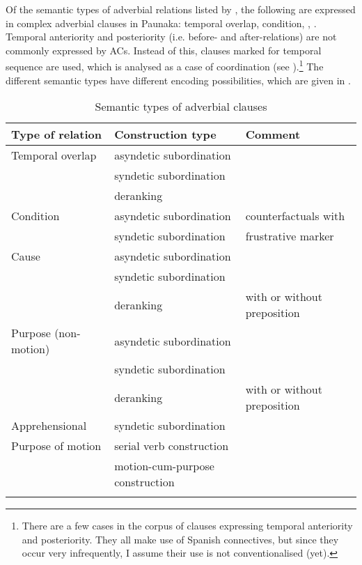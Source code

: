 Of the semantic types of adverbial relations listed by \citet[156]{Cristofaro2003}, the following are expressed in complex adverbial clauses in Paunaka: temporal overlap, condition, , . Temporal anteriority and posteriority (i.e. before- and after-relations) are not commonly expressed by ACs. Instead of this, clauses marked for temporal sequence are used, which is analysed as a case of coordination (see ).\footnote{There are a few cases in the corpus of clauses expressing temporal anteriority and posteriority. They all make use of Spanish connectives, but since they occur very infrequently, I assume their use is not conventionalised (yet).} The different semantic types have different encoding possibilities, which are given in . 

\begin{table}
\caption{Semantic types of adverbial clauses}

\begin{tabularx}{\textwidth}{lQQ}
\lsptoprule
Type of relation & Construction type & Comment \\
\midrule
Temporal overlap & asyndetic subordination & \\
& syndetic subordination & \\
& deranking & \\
Condition & asyndetic subordination & counterfactuals with \\
& syndetic subordination & frustrative marker\\
Cause & asyndetic subordination & \\
& syndetic subordination & \\
& deranking & with or without preposition\\
Purpose (non-motion) & asyndetic subordination & \\
 & syndetic subordination & \\
& deranking & with or without preposition \\
Apprehensional & syndetic subordination & \\
Purpose of motion & serial verb construction &\\
& motion-cum-purpose construction & \\
\lspbottomrule
\end{tabularx}

\label{table:AC-Types}
\end{table}


